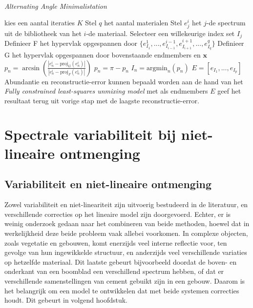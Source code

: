 \documentclass[12pt]{report}
\newcommand{\proj}[2]{\text{proj}_{#2}\left(#1\right)}
\begin{document}
\begin{algorithm}
\caption{\textit{Alternating Angle Minimalistation} \label{al:AAM}}
\begin{algorithmic}[1]
\State kies een aantal iteraties $K$
\State Stel $q$ het aantal materialen
\State Stel $e_j^i$ het $j$-de spectrum uit de bibliotheek van het $i$-de materiaal.
\State Selecteer een willekeurige index set $I_j$
\State Definieer F het hypervlak opgespannen door $\{e^1_{I_1},...,e^{i-1}_{I_{i-1}},e^{i+1}_{I_{i+1}},...,e^q_{I_q}\}$
\State Definieer G het hypervlak opgespannen door bovenstaande endmembers en $\bm{x}$
\State $p_n = \arcsin \left(\frac{\left|e^i_n - \proj{e^i_n}{G}\right|}{\left|e^i_n - \proj{e^i_n}{F}\right|}\right)$
\If {$(e^i_n - \proj{e^i_n}{F}) \dot (x - proj{x}{F}) < 0$}
\State $p_n = \pi - p_n$
\EndIf
\EndFor
\EndFor
\State $I_n = \text{argmin}_n\left(p_n\right)$
\EndFor
\State $E = [e_{I_1},...,e_{I_p}]$
\State Abundantie en reconstructie-error kunnen bepaald worden aan de hand van het \textit{Fully constrained
least-squares unmixing model} met als endmembers $E$
\EndFor
\State geef het resultaat terug uit vorige stap met de laagste reconstructie-error.
\end{algorithmic}
\end{algorithm}


\chapter{Spectrale variabiliteit bij niet-lineaire ontmenging}



\section{Variabiliteit en niet-lineaire ontmenging}

Zowel variabiliteit en niet-lineariteit zijn uitvoerig bestudeerd in de literatuur, en verschillende correcties op het lineaire model zijn doorgevoerd. Echter, er is weinig onderzoek gedaan naar het combineren van beide methoden, hoewel dat in werkelijkheid deze beide probleem vaak allebei voorkomen. In complexe objecten, zoals vegetatie en gebouwen, komt enerzijds veel interne reflectie voor, ten gevolge van hun ingewikkelde structuur, en anderzijds veel verschillende variaties op hetzelfde materiaal. Dit laatste gebeurt bijvoorbeeld doordat de boven- en onderkant van een boomblad een verschillend spectrum hebben, of dat er verschillende samenstellingen van cement gebuikt zijn in een gebouw. Daarom is het belangrijk om een model te ontwikkelen dat met beide systemen correcties houdt. Dit gebeurt in volgend hoofdstuk.
\end{document}
